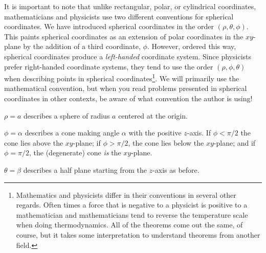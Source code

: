 It is important to note that unlike rectangular, polar, or cylindrical coordinates,
mathematicians and physicists use two different conventions for spherical coordinates.
We have introduced spherical coordinates in the order $(\rho,\theta,\phi)$.  This
paints spherical coordinates as an extension of polar coordinates in the $xy$-plane by
the addition of a third coordinate, $\phi$.  However, ordered this way, spherical
coordinates produce a \emph{left-handed} coordinate system.  Since physicists prefer
right-handed coordinate systems, they tend to use the order $(\rho,\phi,\theta)$ when
describing points in spherical coordinates\footnote{ Mathematics and physicists
differ in their conventions in several other regards.  Often times a force that is negative
to a physicist is positive to a mathematician and mathematicians tend to reverse the temperature
scale when doing thermodynamics.  All of the theorems come out the same, of course,
but it takes some interpretation to understand theorems from another field.}.  
We will primarily use the mathematical convention,
but when you read problems presented in spherical coordinates in other contexts, be
aware of what convention the author is using!


\begin{example}
$\rho = a$ describes a sphere of radius $a$ centered at the origin.
\end{example}

\begin{example}
$\phi = \alpha$ describes a cone making angle $\alpha$ with the
positive $z$-axis.  If $\phi<\pi/2$ the cone lies above the $xy$-plane;
	if $\phi>\pi/2$, the cone lies below the $xy$-plane; 
	and if $\phi=\pi/2$, the (degenerate) cone \emph{is} the $xy$-plane.
\end{example}

\begin{example}
$\theta = \beta$ describes a half plane starting from the $z$-axis
as before.
\end{example}


